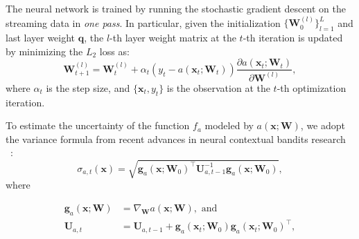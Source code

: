 The neural network is trained by running the stochastic gradient descent on the streaming data in \textit{one pass}. In particular, given the initialization $\{\mathbf{W}_0^{(l)} \}_{l=1}^L$ and last layer weight $\mathbf{q}$, the $l$-th layer weight matrix at the $t$-th iteration is updated by minimizing the $L_2$ loss as:
\begin{equation}
    \label{eqn:train_NN}
    \mathbf{W}_{t+1}^{(l)} = \mathbf{W}_{t}^{(l)} + \alpha_t (y_t - a(\mathbf{x}_t; \mathbf{W}_t)) \frac{\partial a(\mathbf{x}_t; \mathbf{W}_t)}{\partial \mathbf{W}^{(l)}},
\end{equation}
where $\alpha_t$ is the step size, and $\{\mathbf{x}_t, y_t\}$ is the observation at the $t$-th optimization iteration. 



To estimate the uncertainty of the function $f_a$ modeled by $a(\mathbf{x}; \mathbf{W})$, we adopt the variance formula from recent advances in neural contextual bandits research ~\citep{zhou2020neural, kassraie2022neural}:
\begin{equation}
    \label{Eqn:neural_cbo_variance_formula}
    \sigma_{a,t}(\mathbf{x}) = \sqrt{\mathbf{g}_{a}(\mathbf{x}; \mathbf{W}_0)^\top \mathbf{U}_{a, t-1}^{-1} \mathbf{g}_{a}(\mathbf{x}; \mathbf{W}_0)},
\end{equation}
where

\begin{equation}
\label{eqn:ntk_cov}
\begin{aligned}
    \mathbf{g}_{a}(\mathbf{x}; \mathbf{W}) &= \nabla_{\mathbf{W}}a(\mathbf{x}; \mathbf{W}), \text{ and}\\
     \mathbf{U}_{a, t} &= \mathbf{U}_{a, t-1} + \mathbf{g}_{a}(\mathbf{x}_t; \mathbf{W}_0) \mathbf{g}_{a}(\mathbf{x}_t; \mathbf{W}_0)^\top,
\end{aligned}
\end{equation}

